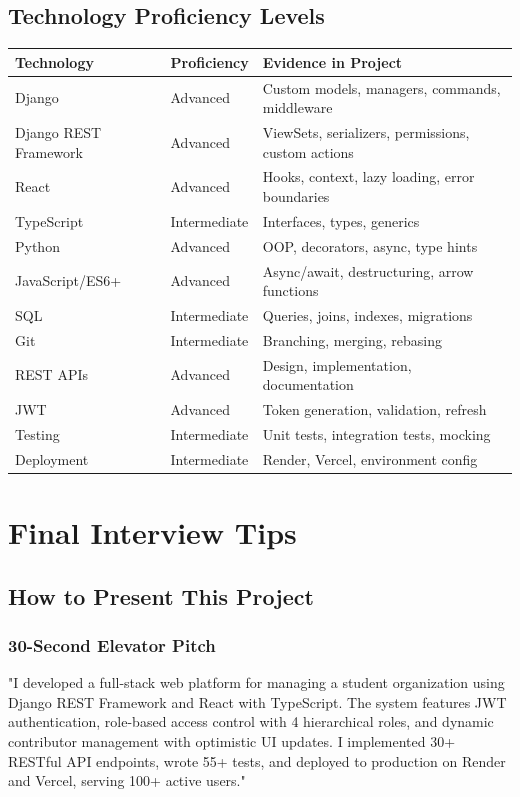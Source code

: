 \documentclass[11pt,a4paper]{article}
\begin{document}
\subsection{Technology Proficiency Levels}
\begin{tabular}{|p{4cm}|p{3cm}|p{7cm}|}
\hline
\textbf{Technology} & \textbf{Proficiency} & \textbf{Evidence in Project} \\
\hline
Django & Advanced & Custom models, managers, commands, middleware \\
\hline
Django REST Framework & Advanced & ViewSets, serializers, permissions, custom actions \\
\hline
React & Advanced & Hooks, context, lazy loading, error boundaries \\
\hline
TypeScript & Intermediate & Interfaces, types, generics \\
\hline
Python & Advanced & OOP, decorators, async, type hints \\
\hline
JavaScript/ES6+ & Advanced & Async/await, destructuring, arrow functions \\
\hline
SQL & Intermediate & Queries, joins, indexes, migrations \\
\hline
Git & Intermediate & Branching, merging, rebasing \\
\hline
REST APIs & Advanced & Design, implementation, documentation \\
\hline
JWT & Advanced & Token generation, validation, refresh \\
\hline
Testing & Intermediate & Unit tests, integration tests, mocking \\
\hline
Deployment & Intermediate & Render, Vercel, environment config \\
\hline
\end{tabular}

\section{Final Interview Tips}

\subsection{How to Present This Project}

\subsubsection{30-Second Elevator Pitch}
"I developed a full-stack web platform for managing a student organization using Django REST Framework and React with TypeScript. The system features JWT authentication, role-based access control with 4 hierarchical roles, and dynamic contributor management with optimistic UI updates. I implemented 30+ RESTful API endpoints, wrote 55+ tests, and deployed to production on Render and Vercel, serving 100+ active users."
\end{document}
